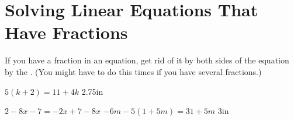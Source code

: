 \section{Solving Linear Equations That Have Fractions}

If you have a fraction in an equation, 
get rid of it by  both sides of the equation 
by the .
(You might have to do this  times if you have several fractions.)
\vspace{1\baselineskip}

{
    \centering
    $ 5(k+2) = 11 + 4k$
}
{2.75in}

\myProblems
{
    \centering
    $ 2 - 8x - 7 = -2x + 7 - 8x $
}
{
    \centering
    $ -6m - 5(1+5m) = 31 + 5m$
}
{3in}
